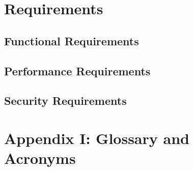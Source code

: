 \documentclass[english,titlepage,a4paper]{report}
\begin{document}
\chapter{Requirements} \label{chapter_4}
\section{Functional Requirements}

\section{Performance Requirements}

\section{Security Requirements}


\chapter*{Appendix I: Glossary and Acronyms}

\printglossary
\printglossary[type=\acronymtype]
\end{document}
